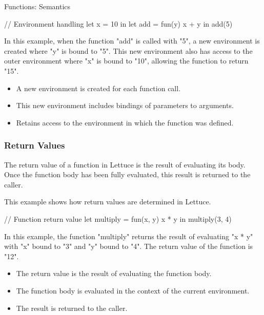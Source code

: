 \begin{notes}{Functions: Semantics}
\begin{highlight}
    \begin{code}[Lettuce]
    // Environment handling
    let x = 10 in
    let add = fun(y) {
        x + y
    } in
    add(5)
    \end{code}
    
        In this example, when the function "add" is called with "5", a new environment is created where "y" is bound to "5". This new environment also has access to the outer environment where "x" is bound to "10", allowing the function to return "15".
    
        \begin{itemize}
            \item A new environment is created for each function call.
            \item This new environment includes bindings of parameters to arguments.
            \item Retains access to the environment in which the function was defined.
        \end{itemize}
    
    \end{highlight}
    
    \subsubsection*{Return Values}
    
    The return value of a function in Lettuce is the result of evaluating its body. Once the function body has been fully evaluated, this result is returned to the caller.
    
    \begin{highlight}
    
        This example shows how return values are determined in Lettuce.
    
    \begin{code}[Lettuce]
    // Function return value
    let multiply = fun(x, y) {
        x * y
    } in
    multiply(3, 4)
    \end{code}
    
        In this example, the function "multiply" returns the result of evaluating "x * y" with "x" bound to "3" and "y" bound to "4". The return value of the function is "12".
    
        \begin{itemize}
            \item The return value is the result of evaluating the function body.
            \item The function body is evaluated in the context of the current environment.
            \item The result is returned to the caller.
        \end{itemize}
    

\end{highlight}
\end{notes}
